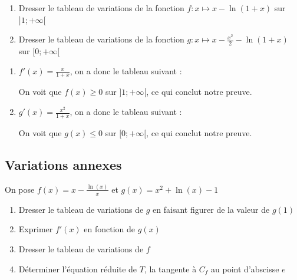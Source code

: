 \documentclass[oneside,12pt]{book}          %
\begin{document}
\begin{hint}
	\begin{enumerate}
		\item Dresser le tableau de variations de la fonction $f:x\mapsto x-\ln(1+x)$ sur $]1;+\infty[$
		\item Dresser le tableau de variations de la fonction $g:x\mapsto x-\frac{x^2}{2}-\ln(1+x)$ sur $[0;+\infty[$
	\end{enumerate}
\end{hint}
\begin{sol}
	\begin{enumerate}
		\item $f'(x)=\frac{x}{1+x}$, on a donc le tableau suivant :\\
		
		On voit que $f(x)\geq0$ sur $]1;+\infty[$, ce qui conclut notre preuve.
		\item $g'(x)=\frac{x^2}{1+x}$, on a donc le tableau suivant :\\
		
		On voit que $g(x)\leq0$ sur $[0;+\infty[$, ce qui conclut notre preuve.
	\end{enumerate}
\end{sol}



\subsection{Variations annexes}
On pose $f(x) = x - \frac{\ln(x)}{x}$ et $g(x)=x^2+\ln(x)-1$
\begin{enumerate}
    \item Dresser le tableau de variations de $g$ en faisant figurer de la valeur de $g(1)$
    \item Exprimer $f'(x)$ en fonction de $g(x)$
    \item Dresser le tableau de variations de $f$
    \item Déterminer l'équation réduite de $T$, la tangente à $C_f$ au point d'abscisse $e$
\end{enumerate}
\end{document}
